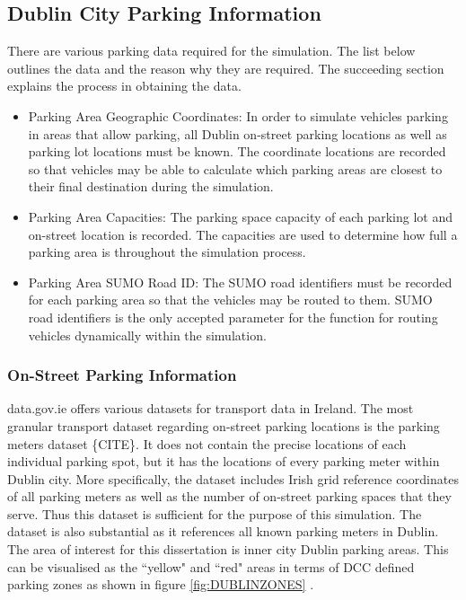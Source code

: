 \subsection{Dublin City Parking Information}
There are various parking data required for the simulation. The list below outlines the data and the reason why they are required. The succeeding section explains the process in obtaining the data.

\begin{itemize}
    \item Parking Area Geographic Coordinates: In order to simulate vehicles parking in areas that allow parking, all Dublin on-street parking locations as well as parking lot locations must be known. The coordinate locations are recorded so that vehicles may be able to calculate which parking areas are closest to their final destination during the simulation.
    \item Parking Area Capacities: The parking space capacity of each parking lot and on-street location is recorded. The capacities are used to determine how full a parking area is throughout the simulation process.
    \item Parking Area SUMO Road ID: The SUMO road identifiers must be recorded for each parking area so that the vehicles may be routed to them. SUMO road identifiers is the only accepted parameter for the function for routing vehicles dynamically within the simulation.
\end{itemize}

\subsubsection{On-Street Parking Information}\label{ssec:on-street_parking_info}
data.gov.ie offers various datasets for transport data in Ireland. The most granular transport dataset regarding on-street parking locations is the parking meters dataset \{CITE\}. It does not contain the precise locations of each individual parking spot, but it has the locations of every parking meter within Dublin city. More specifically, the dataset includes Irish grid reference coordinates of all parking meters as well as the number of on-street parking spaces that they serve. Thus this dataset is sufficient for the purpose of this simulation. The dataset is also substantial as it references all known parking meters in Dublin. The area of interest for this dissertation is inner city Dublin parking areas. This can be visualised as the ``yellow" and ``red" areas in terms of \ac{DCC} defined parking zones as shown in figure \ref{fig:DUBLINZONES} \citep{2017DublinTariffs}. 

